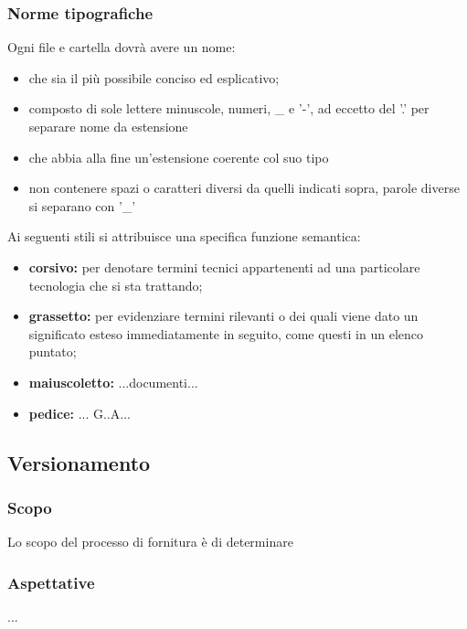         \subsubsection{Norme tipografiche}
                Ogni file e cartella dovrà avere un nome:
                \begin{itemize}
                    \item che sia il più possibile conciso ed esplicativo;
                    \item composto di sole lettere minuscole, numeri, \_ e '-', ad eccetto del '.' per separare nome da estensione
                    \item che abbia alla fine un'estensione coerente col suo tipo
                    \item non contenere spazi o caratteri diversi da quelli indicati sopra, parole diverse si separano con '\_'
                \end{itemize}
                Ai seguenti stili si attribuisce una specifica funzione semantica:
                \begin{itemize}
                    \item \textbf{corsivo: }per denotare termini tecnici appartenenti ad una particolare tecnologia che si sta trattando;
                    \item \textbf{grassetto: }per evidenziare termini rilevanti o dei quali viene dato un significato esteso immediatamente in seguito, come questi in un elenco puntato;
                    \item \textbf{maiuscoletto: }...documenti...
                    \item \textbf{pedice: } ... G..A...
                \end{itemize}


\subsection{Versionamento} %
    \subsubsection{Scopo}
    Lo scopo del processo di fornitura è di determinare
    \subsubsection{Aspettative}
    ...
